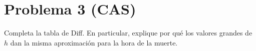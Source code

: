 \section*{Problema 3 (CAS)}
Completa la tabla de Diff. En particular, explique por qué los valores grandes de $h$ dan la misma aproximación para la hora de la muerte.